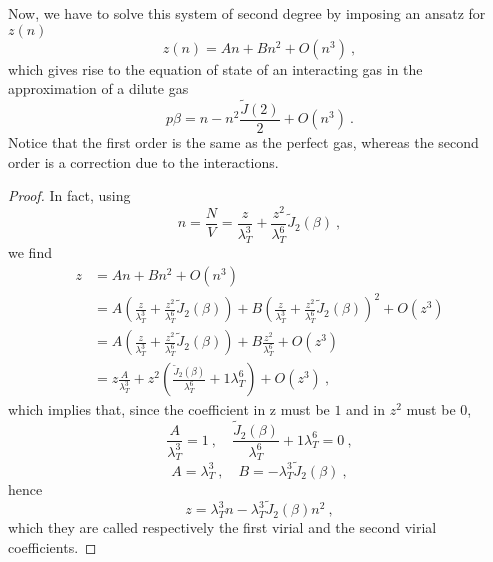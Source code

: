     Now, we have to solve this system of second degree by imposing an ansatz for $z(n)$
    \begin{equation*}
        z (n) = A n + B n^2 + O(n^3) ~,
    \end{equation*}
    which gives rise to the equation of state of an interacting gas in the approximation of a dilute gas
    \begin{equation*}
        p \beta = n - n^2 \frac{\tilde J(2)}{2} + O(n^3) ~.
    \end{equation*}
    Notice that the first order is the same as the perfect gas, whereas the second order is a correction due to the interactions.
    \begin{proof}
        In fact, using 
        \begin{equation*}
            n = \frac{N}{V} = \frac{z}{\lambda_T^3} + \frac{z^2}{\lambda_T^6} \tilde J_2 (\beta) ~,
        \end{equation*}
        we find 
        \begin{equation*}
        \begin{aligned}
            z & = A n + B n^2 + O(n^3) \\ & = A (\frac{z}{\lambda_T^3} + \frac{z^2}{\lambda_T^6} \tilde J_2 (\beta)) + B (\frac{z}{\lambda_T^3} + \frac{z^2}{\lambda_T^6} \tilde J_2 (\beta))^2 + O(z^3) \\ & = A (\frac{z}{\lambda_T^3} + \frac{z^2}{\lambda_T^6} \tilde J_2 (\beta)) + B \frac{z^2}{\lambda_T^6} + O(z^3) \\ & = z \frac{A}{\lambda_T^3} + z^2 ( \frac{\tilde J_2 (\beta)}{\lambda_T^6} + {1}{\lambda_T^6}) + O (z^3) ~,
        \end{aligned}
        \end{equation*}
        which implies that, since the coefficient in z must be $1$ and in $z^2$ must be $0$, 
        \begin{equation*}
            \frac{A}{\lambda_T^3} = 1 ~, \quad \frac{\tilde J_2 (\beta)}{\lambda_T^6} + {1}{\lambda_T^6} = 0 ~,
        \end{equation*}
        \begin{equation*}
            A = \lambda_T^3 ~, \quad B = - \lambda^3_T \tilde J_2(\beta) ~,
        \end{equation*}
        hence 
        \begin{equation*}
            z = \lambda_T^3 n - \lambda^3_T \tilde J_2(\beta) n^2 ~,
        \end{equation*}
        which they are called respectively the first virial and the second virial coefficients.

\end{proof}
